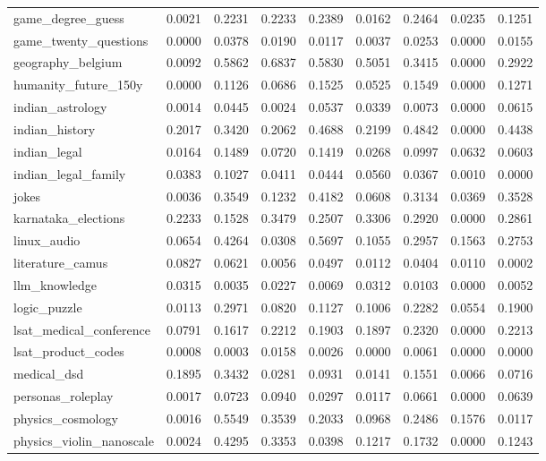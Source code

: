 \documentclass[pdflatex,sn-mathphys-num]{sn-jnl}%
\theoremstyle{thmstyleone}%
\theoremstyle{thmstyletwo}%
\theoremstyle{thmstylethree}%
\begin{document}
\begin{appendices}
\begin{landscape}
\begin{longtable}{@{}p{3.8cm}cccccccc@{}}
game\_degree\_guess & 0.0021 & 0.2231 & 0.2233 & 0.2389 & 0.0162 & 0.2464 & 0.0235 & 0.1251 \\
game\_twenty\_questions & 0.0000 & 0.0378 & 0.0190 & 0.0117 & 0.0037 & 0.0253 & 0.0000 & 0.0155 \\
geography\_belgium & 0.0092 & 0.5862 & 0.6837 & 0.5830 & 0.5051 & 0.3415 & 0.0000 & 0.2922 \\
humanity\_future\_150y & 0.0000 & 0.1126 & 0.0686 & 0.1525 & 0.0525 & 0.1549 & 0.0000 & 0.1271 \\
indian\_astrology & 0.0014 & 0.0445 & 0.0024 & 0.0537 & 0.0339 & 0.0073 & 0.0000 & 0.0615 \\
indian\_history & 0.2017 & 0.3420 & 0.2062 & 0.4688 & 0.2199 & 0.4842 & 0.0000 & 0.4438 \\
indian\_legal & 0.0164 & 0.1489 & 0.0720 & 0.1419 & 0.0268 & 0.0997 & 0.0632 & 0.0603 \\
indian\_legal\_family & 0.0383 & 0.1027 & 0.0411 & 0.0444 & 0.0560 & 0.0367 & 0.0010 & 0.0000 \\
jokes & 0.0036 & 0.3549 & 0.1232 & 0.4182 & 0.0608 & 0.3134 & 0.0369 & 0.3528 \\
karnataka\_elections & 0.2233 & 0.1528 & 0.3479 & 0.2507 & 0.3306 & 0.2920 & 0.0000 & 0.2861 \\
linux\_audio & 0.0654 & 0.4264 & 0.0308 & 0.5697 & 0.1055 & 0.2957 & 0.1563 & 0.2753 \\
literature\_camus & 0.0827 & 0.0621 & 0.0056 & 0.0497 & 0.0112 & 0.0404 & 0.0110 & 0.0002 \\
llm\_knowledge & 0.0315 & 0.0035 & 0.0227 & 0.0069 & 0.0312 & 0.0103 & 0.0000 & 0.0052 \\
logic\_puzzle & 0.0113 & 0.2971 & 0.0820 & 0.1127 & 0.1006 & 0.2282 & 0.0554 & 0.1900 \\
lsat\_medical\_conference & 0.0791 & 0.1617 & 0.2212 & 0.1903 & 0.1897 & 0.2320 & 0.0000 & 0.2213 \\
lsat\_product\_codes & 0.0008 & 0.0003 & 0.0158 & 0.0026 & 0.0000 & 0.0061 & 0.0000 & 0.0000 \\
medical\_dsd & 0.1895 & 0.3432 & 0.0281 & 0.0931 & 0.0141 & 0.1551 & 0.0066 & 0.0716 \\
personas\_roleplay & 0.0017 & 0.0723 & 0.0940 & 0.0297 & 0.0117 & 0.0661 & 0.0000 & 0.0639 \\
physics\_cosmology & 0.0016 & 0.5549 & 0.3539 & 0.2033 & 0.0968 & 0.2486 & 0.1576 & 0.0117 \\
physics\_violin\_nanoscale & 0.0024 & 0.4295 & 0.3353 & 0.0398 & 0.1217 & 0.1732 & 0.0000 & 0.1243 \\

\end{longtable}
\end{landscape}
\end{appendices}
\end{document}
